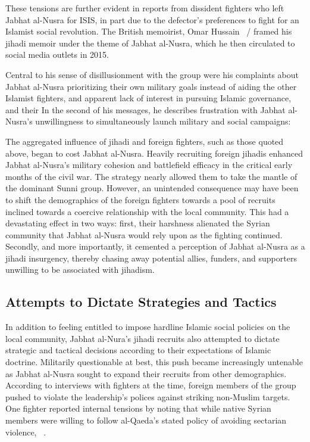 These tensions are further evident in reports from dissident fighters who left Jabhat al-Nusra for ISIS, in part due to the defector's preferences to fight for an Islamist social revolution.  The British memoirist, Omar Hussain ~/  framed his jihadi memoir under the theme of  Jabhat al-Nusra, which he then circulated to social media outlets in 2015. 

Central to his sense of disillusionment with the group were his complaints about Jabhat al-Nusra prioritizing their own military goals instead of aiding the other Islamist fighters, and apparent lack of interest in pursuing Islamic governance, and their   In the second of his messages, he describes frustration with Jabhat al-Nusra's unwillingness to simultaneously launch military and social campaigns: ~\autocite{hussein2015exposing}

The aggregated influence of jihadi and foreign fighters, such as those quoted above, began to cost Jabhat al-Nusra. Heavily recruiting foreign jihadis enhanced Jabhat al-Nusra's military cohesion and battlefield efficacy in the critical early months of the civil war. The strategy nearly allowed them to take the mantle of the dominant Sunni group. However, an unintended consequence may have been to shift the demographics of the foreign fighters towards a pool of recruits inclined towards a coercive relationship with the local community. This had a devastating effect in two ways: first, their harshness alienated the Syrian community that Jabhat al-Nusra would rely upon as the fighting continued. Secondly, and more importantly, it cemented a perception of Jabhat al-Nusra as a jihadi insurgency, thereby chasing away potential allies, funders, and supporters unwilling to be associated with jihadism.


\subsection{Attempts to Dictate Strategies and Tactics}

In addition to feeling entitled to impose hardline Islamic social policies on the local community, Jabhat al-Nura's jihadi recruits also attempted to dictate strategic and tactical decisions according to their expectations of Islamic doctrine.  Militarily questionable at best, this push became increasingly untenable as Jabhat al-Nusra sought to expand their recruits from other demographics. According to interviews with fighters at the time, foreign members of the group pushed to violate the leadership's polices against striking non-Muslim targets. One fighter reported internal tensions by noting that while native Syrian members were willing to follow al-Qaeda's stated policy of avoiding sectarian violence, ~\autocite{sherlock2012inside}.


